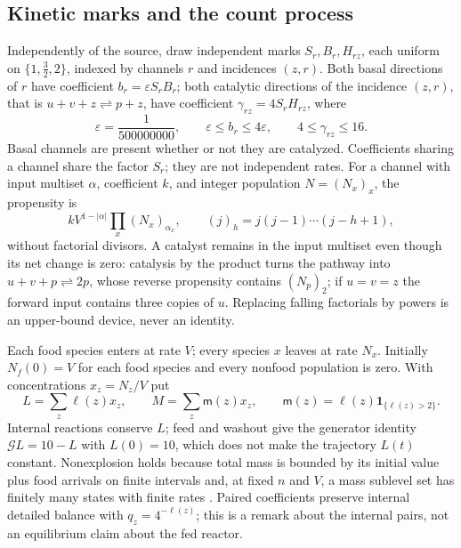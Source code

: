 \documentclass[11pt,letterpaper]{article}
\theoremstyle{plain}
\theoremstyle{definition}
\theoremstyle{remark}
\numberwithin{equation}{section}
\newcommand{\cG}{\mathcal G}
\newcommand{\eps}{\varepsilon}
\newcommand{\ind}{\mathbf 1}
\newcommand{\m}{\mathsf m}
\begin{document}
\subsection{Kinetic marks and the count process}\label{sec:kinetics}
Independently of the source, draw independent marks $S_r,B_r,H_{rz}$, each uniform on $\{1,\tfrac32,2\}$, indexed by channels $r$ and incidences $(z,r)$. Both basal directions of $r$ have coefficient $b_r=\eps S_rB_r$; both catalytic directions of the incidence $(z,r)$, that is $u+v+z\rightleftharpoons p+z$, have coefficient $\gamma_{rz}=4S_rH_{rz}$, where
\begin{equation}\label{eq:rates}
 \eps=\frac1{500000000},\qquad \eps\le b_r\le4\eps,\qquad 4\le\gamma_{rz}\le16 .
\end{equation}
Basal channels are present whether or not they are catalyzed. Coefficients sharing a channel share the factor $S_r$; they are not independent rates. For a channel with input multiset $\alpha$, coefficient $k$, and integer population $N=(N_x)_x$, the propensity is
\begin{equation}\label{eq:falling}
 kV^{1-|\alpha|}\prod_x(N_x)_{\alpha_x},\qquad (j)_h=j(j-1)\cdots(j-h+1),
\end{equation}
without factorial divisors. A catalyst remains in the input multiset even though its net change is zero: catalysis by the product turns the pathway into $u+v+p\rightleftharpoons2p$, whose reverse propensity contains $(N_p)_2$; if $u=v=z$ the forward input contains three copies of $u$. Replacing falling factorials by powers is an upper-bound device, never an identity.

Each food species enters at rate $V$; every species $x$ leaves at rate $N_x$. Initially $N_f(0)=V$ for each food species and every nonfood population is zero. With concentrations $x_z=N_z/V$ put
\begin{equation}\label{eq:mass}
 L=\sum_z\ell(z)x_z,\qquad M=\sum_z\m(z)x_z,\qquad \m(z)=\ell(z)\ind_{\{\ell(z)>2\}} .
\end{equation}
Internal reactions conserve $L$; feed and washout give the generator identity $\cG L=10-L$ with $L(0)=10$, which does not make the trajectory $L(t)$ constant. Nonexplosion holds because total mass is bounded by its initial value plus food arrivals on finite intervals and, at fixed $n$ and $V$, a mass sublevel set has finitely many states with finite rates \cite{anderson2011continuous}. Paired coefficients preserve internal detailed balance with $q_z=4^{-\ell(z)}$; this is a remark about the internal pairs, not an equilibrium claim about the fed reactor.
\end{document}
